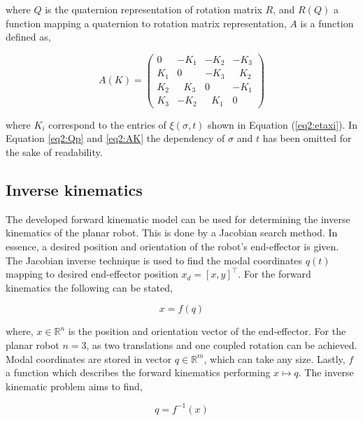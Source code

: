 where $Q$ is the quaternion representation of rotation matrix $R$, and $R(Q)$ a function mapping a quaternion to rotation matrix representation, $A$ is a function defined as,


\begin{equation}
    A(K) = \begin{pmatrix} 0 & -K_1 & -K_2 & -K_3 \\ K_1 & 0 & -K_3 & \hspace{8pt}K_2 \\ K_2 & \hspace{8pt}K_3 & 0 & -K_1 \\ K_3 & -K_2 & \hspace{8pt}K_1 & 0 \end{pmatrix}
    \label{eq2:AK}
\end{equation}

where $K_i$ correspond to the entries of $\xi(\sigma,t)$ shown in Equation (\ref{eq2:etaxi}). In Equation \ref{eq2:Qp} and \ref{eq2:AK} the dependency of $\sigma$ and $t$ has been omitted for the sake of readability.

\subsection{Inverse kinematics}

The developed forward kinematic model can be used for determining the inverse kinematics of the planar robot. This is done by a Jacobian search method. In essence, a desired position and orientation of the robot's end-effector is given. The Jacobian inverse technique is used to find the modal coordinates $q(t)$ mapping to desired end-effector position $x_d = [x,y]^\top$. For the forward kinematics the following can be stated,

\begin{equation}
    x = f(q)
\end{equation}

where, $x \in \mathbb{R}^n$ is the position and orientation vector of the end-effector. For the planar robot $n = 3$, as two translations and one coupled rotation can be achieved. Modal coordinates are stored in vector $q \in \mathbb{R}^m$, which can take any size. Lastly, $f$ a function which describes the forward kinematics performing $x \mapsto q$. The inverse kinematic problem aims to find,

\begin{equation}
    q = f^{-1}(x)
    \label{eq2:q}
\end{equation}

